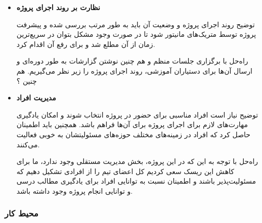 \begin{itemize}
	
	\item 
	\textbf{نظارت بر روند اجرای پروژه‌}

	توضیح \hspace*{1cm} 
	روند اجرای پروژه و وضعیت آن باید به طور مرتب بررسی شده و پیشرفت پروژه توسط متریک‌های مانیتور شود تا در صورت وجود مشکل بتوان در سریع‌ترین زمان از آن مطلع شد و برای رفع آن اقدام کرد.
	
	راه‌حل \hspace*{1cm} 
	با برگزاری جلسات منظم و هم چنین نوشتن گزارشات به طور دوره‌ای و ارسال آن‌ها برای دستیاران آموزشی، روند اجرای پروژه را زیر نظر می‌گیریم.
هم چنین ؟
	
\item 
\textbf{مدیریت افراد‌}

توضیح \hspace*{1cm} 
نیاز است افراد مناسبی برای حضور در پروژه انتخاب شوند و امکان یادگیری مهارت‌های لازم برای اجرای پروژه برای آن‌ها فراهم باشد. همچنین باید اطمینان حاصل کرد که افراد در زمینه‌های مختلف حوزه‌های مسئولیتشان به خوبی فعالیت می‌کنند.

راه‌حل \hspace*{1cm} 
با توجه به این که در این پروژه، بخش مدیریت مستقلی وجود ندارد، ما برای کاهش این ریسک سعی کردیم کل اعضای تیم را از افرادی تشکیل دهیم که مسئولیت‌پذیر باشند و اطمینان نسبت به توانایی‌ افراد برای یادگیری مطالب درسی و توانایی انجام پروژه وجود داشته باشد.


\end{itemize}

\subsubsection{محیط کار}


